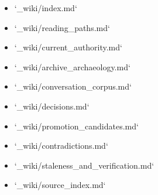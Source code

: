 \documentclass[11pt,a4paper]{report}
\begin{document}
\begin{itemize}
\item `\_wiki/\allowbreak{}index.\allowbreak{}md`
\item `\_wiki/\allowbreak{}reading\_paths.\allowbreak{}md`
\item `\_wiki/\allowbreak{}current\_authority.\allowbreak{}md`
\item `\_wiki/\allowbreak{}archive\_archaeology.\allowbreak{}md`
\item `\_wiki/\allowbreak{}conversation\_corpus.\allowbreak{}md`
\item `\_wiki/\allowbreak{}decisions.\allowbreak{}md`
\item `\_wiki/\allowbreak{}promotion\_candidates.\allowbreak{}md`
\item `\_wiki/\allowbreak{}contradictions.\allowbreak{}md`
\item `\_wiki/\allowbreak{}staleness\_and\_verification.\allowbreak{}md`
\item `\_wiki/\allowbreak{}source\_index.\allowbreak{}md`
\end{itemize}
\end{document}
